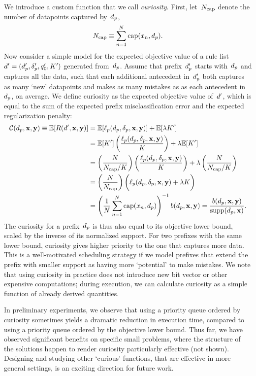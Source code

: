 We introduce a custom function that we call \emph{curiosity}.
%
First, let~$N_{\textnormal{cap}}$ denote the number of datapoints captured by~$d_p$, \ie
\begin{align}
N_{\textnormal{cap}} \equiv \sum_{n=1}^N \textnormal{cap}(x_n, d_p). \nonumber
\end{align}
%
Now consider a simple model for the expected objective value of a rule list
${{d}' = (d_p', \delta_p', q_0', K')}$ generated from~$d_p$.
%
Assume that prefix~$d_p'$ starts with~$d_p$ and captures all the data,
such that each additional antecedent in~$d_p'$
both captures as many `new' datapoints and makes as many mistakes as
as each antecedent in~$d_p$, on average.
%
We define curiosity as the expected objective value of~${d}'$,
which is equal to the sum of the expected prefix
misclassification error and the expected regularization penalty:
\begin{align}
\mathcal{C}(d_p, \mathbf{x}, \mathbf{y}) \equiv \mathbb{E}[ R({d}', \mathbf{x}, \mathbf{y}) ] &= \mathbb{E}[\ell_p(d_p, \delta_p, \mathbf{x}, \mathbf{y})] + \mathbb{E}[ {\lambda} K' ] \nonumber \\
&= \mathbb{E}[ K' ] \left(\frac{\ell_p(d_p, \delta_p, \mathbf{x}, \mathbf{y})}{K}\right) + {\lambda} \mathbb{E}[ K' ] \nonumber \\
&=  \left(\frac{N}{N_{\textnormal{cap}} / K}\right)
  \left(\frac{\ell_p(d_p, \delta_p, \mathbf{x}, \mathbf{y})}{K}\right)
  + {\lambda} \left(\frac{N}{N_{\textnormal{cap}} / K}\right) \nonumber \\
&= \left( \frac{N}{N_{\textnormal{cap}}} \right) \biggl(\ell_p(d_p, \delta_p, \mathbf{x}, \mathbf{y}) + {\lambda} K \biggr) \nonumber \\
&= \left( \frac{1}{N} \sum_{n=1}^N \textnormal{cap}(x_n, d_p) \right)^{-1} b(d_p, \mathbf{x}, \mathbf{y})
= \frac{b(d_p, \mathbf{x}, \mathbf{y})}{\textnormal{supp}(d_p, \mathbf{x})}. \nonumber
\end{align}
%
The curiosity for a prefix~$d_p$ is thus also equal to its objective lower bound,
scaled by the inverse of its normalized support.
%
For two prefixes with the same lower bound, curiosity gives higher priority to
the one that captures more data.
%
This is a well-motivated scheduling strategy if we model prefixes that extend
the prefix with smaller support as having more `potential' to make mistakes.
%
We note that using curiosity in practice does not introduce new bit vector
or other expensive computations; during execution, we can calculate curiosity
as a simple function of already derived quantities.

In preliminary experiments, we observe that using a priority queue ordered by
curiosity sometimes yields a dramatic reduction in execution time,
compared to using a priority queue ordered by the objective lower bound.
%
Thus far, we have observed significant benefits on specific small problems,
where the structure of the solutions happen to render curiosity particularly
effective (not shown).
%
Designing and studying other `curious' functions, that are effective in more
general settings, is an exciting direction for future work.

